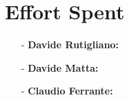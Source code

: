 \documentclass[a4paper]{article}
\begin{document}
\section{Effort Spent}
    \begin{itemize}
        \item[-] \textbf{Davide Rutigliano:}
        
        \item[-] \textbf{Davide Matta:}
        
        \item[-] \textbf{Claudio Ferrante:}
    \end{itemize}
\end{document}
